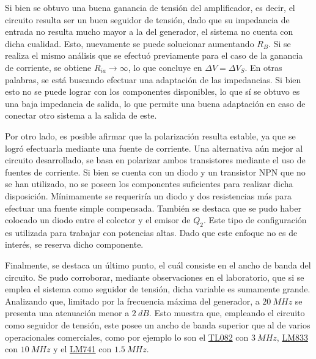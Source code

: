 Si bien se obtuvo una buena ganancia de tensión del amplificador, es decir, el circuito resulta ser un buen seguidor de tensión, dado que su impedancia de entrada no resulta mucho mayor a la del generador, el sistema no cuenta con dicha cualidad. Esto, nuevamente se puede solucionar aumentando $R_B$. Si se realiza el mismo análisis que se efectuó previamente para el caso de la ganancia de corriente, se obtiene $R_{ia} \rightarrow \infty$, lo que concluye en $\Delta V = \Delta V_S$. En otras palabras, se está buscando efectuar una adaptación de las impedancias. Si bien esto no se puede lograr con los componentes disponibles, lo que sí se obtuvo es una baja impedancia de salida, lo que permite una buena adaptación en caso de conectar otro sistema a la salida de este. 

Por otro lado, es posible afirmar que la polarización resulta estable, ya que se logró efectuarla mediante una fuente de corriente. Una alternativa aún mejor al circuito desarrollado, se basa en polarizar ambos transistores mediante el uso de fuentes de corriente. Si bien se cuenta con un diodo y un transistor NPN que no se han utilizado, no se poseen los componentes suficientes para realizar dicha disposición. Mínimamente se requeriría un diodo y dos resistencias más para efectuar una fuente simple compensada. También se destaca que se pudo haber colocado un diodo entre el colector y el emisor de $Q_2$. Este tipo de configuración es utilizada para trabajar con potencias altas. Dado que este enfoque no es de interés, se reserva dicho componente.

Finalmente, se destaca un último punto, el cuál consiste en el ancho de banda del circuito. Se pudo corroborar, mediante observaciones en el laboratorio, que si se emplea el sistema como seguidor de tensión, dicha variable es sumamente grande. Analizando que, limitado por la frecuencia máxima del generador, a $20 \ MHz$ se presenta una atenuación menor a $2 \ dB$. Esto muestra que, empleando el circuito como seguidor de tensión, este posee un ancho de banda superior que al de varios operacionales comerciales, como por ejemplo lo son el \href{http://www.ti.com/lit/ds/symlink/tl082-n.pdf}{TL082} con $3 \ MHz$, \href{http://www.ti.com/lit/ds/symlink/lm833.pdf}{LM833} con $10 \ MHz$ y el \href{http://www.ti.com/lit/ds/symlink/lm741.pdf}{LM741} con $1.5 \ MHz$.
